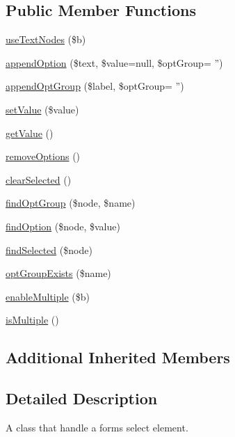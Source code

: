 \subsection*{Public Member Functions}
\begin{DoxyCompactItemize}
\item 
\hyperlink{classDom_1_1Form_1_1Select_a22d9f7515e9f3772c367ffb3493420fe}{use\+Text\+Nodes} (\$b)
\item 
\hyperlink{classDom_1_1Form_1_1Select_a19884e802fb51ddb4fdb546d42f3c3da}{append\+Option} (\$text, \$value=null, \$opt\+Group= '')
\item 
\hyperlink{classDom_1_1Form_1_1Select_ac2a97ca64323d675f0fc06010b7f277e}{append\+Opt\+Group} (\$label, \$opt\+Group= '')
\item 
\hyperlink{classDom_1_1Form_1_1Select_af6459a4d8493264401ccaf0996345442}{set\+Value} (\$value)
\item 
\hyperlink{classDom_1_1Form_1_1Select_ae07c307f55e9d343cccf0767e3b9c591}{get\+Value} ()
\item 
\hyperlink{classDom_1_1Form_1_1Select_a20068cef37dc6e43f6a76b115ee9d289}{remove\+Options} ()
\item 
\hyperlink{classDom_1_1Form_1_1Select_ae10b909e6d753236e926139f8f0a7b14}{clear\+Selected} ()
\item 
\hyperlink{classDom_1_1Form_1_1Select_a15f6e708df950af8113d1c68b4543774}{find\+Opt\+Group} (\$node, \$name)
\item 
\hyperlink{classDom_1_1Form_1_1Select_a0c7357017351f81eb455ec74815208fc}{find\+Option} (\$node, \$value)
\item 
\hyperlink{classDom_1_1Form_1_1Select_abef46ba4aff5fd786a2a6b9e0ae9ee89}{find\+Selected} (\$node)
\item 
\hyperlink{classDom_1_1Form_1_1Select_a3c2f5406d3aa1af29364b8a12690469f}{opt\+Group\+Exists} (\$name)
\item 
\hyperlink{classDom_1_1Form_1_1Select_a57a091c4accd178cbe752d4c67361618}{enable\+Multiple} (\$b)
\item 
\hyperlink{classDom_1_1Form_1_1Select_af80a7d654e6e4fab2d6b2d3fa56b858c}{is\+Multiple} ()
\end{DoxyCompactItemize}
\subsection*{Additional Inherited Members}


\subsection{Detailed Description}
A class that handle a forms select element.

